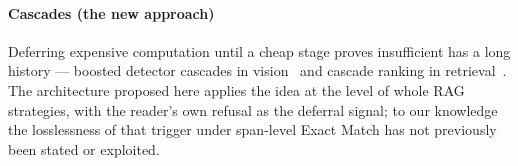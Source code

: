 \paragraph{Cascades (the new approach)}
Deferring expensive computation until a cheap stage proves insufficient has
a long history --- boosted detector cascades in
vision~\citep{viola2001cascade} and cascade ranking in
retrieval~\citep{wang2011cascade}. The architecture proposed here applies
the idea at the level of whole RAG strategies, with the reader's own
refusal as the deferral signal; to our knowledge the losslessness of that
trigger under span-level Exact Match has not previously been stated or
exploited.
